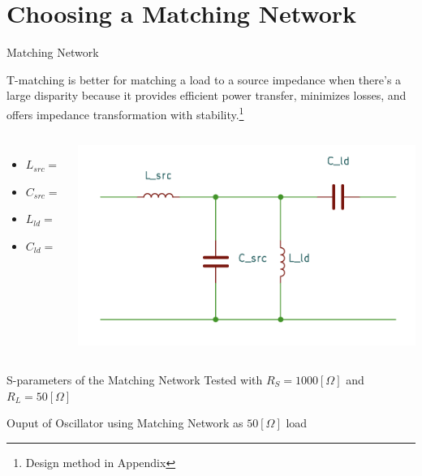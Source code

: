 \documentclass{beamer}
\begin{document}

\section{Choosing a Matching Network}


\begin{frame}{Matching Network}

T-matching is better for matching a load to a source impedance when there's a large disparity because it provides efficient power transfer, minimizes losses, and offers impedance transformation with stability.\footnote{Design method in Appendix}
\begin{columns}

  \begin{itemize}
    \item \(L_{src} = \)
    \item \(C_{src} = \)
    \item \(L_{ld} = \)
    \item \(C_{ld} = \)
  \end{itemize}
  \includegraphics[width = \linewidth]{images/matching_network.png}
\end{columns}
  
\end{frame}

\begin{frame}{S-parameters of the Matching Network}
Tested with \(R_S = 1000 [\Omega]\) and \(R_L = 50[\Omega]\)

\end{frame}

\begin{frame}{Ouput of Oscillator using Matching Network as \(50[\Omega]\) load}

\end{frame}
\end{document}
